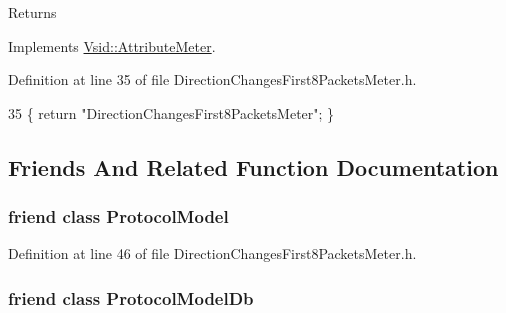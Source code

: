 \begin{DoxyReturn}{Returns}

\end{DoxyReturn}


Implements \hyperlink{class_vsid_1_1_attribute_meter_a24d5a7141e89e948c05edf8f70be8c53}{Vsid\-::\-Attribute\-Meter}.



Definition at line 35 of file Direction\-Changes\-First8\-Packets\-Meter.\-h.


\begin{DoxyCode}
35 \{ \textcolor{keywordflow}{return} \textcolor{stringliteral}{"DirectionChangesFirst8PacketsMeter"}; \}
\end{DoxyCode}


\subsection{Friends And Related Function Documentation}
\hypertarget{class_vsid_1_1_direction_changes_first8_packets_meter_a80219b863d4ff3456933d16bc5f73f45}{
\subsubsection[{Protocol\-Model}]{\setlength{\rightskip}{0pt plus 5cm}friend class {\bf Protocol\-Model}\hspace{0.3cm}{\ttfamily [friend]}}}\label{class_vsid_1_1_direction_changes_first8_packets_meter_a80219b863d4ff3456933d16bc5f73f45}


Definition at line 46 of file Direction\-Changes\-First8\-Packets\-Meter.\-h.

\hypertarget{class_vsid_1_1_direction_changes_first8_packets_meter_a3c0d389e7a9476b06313d8fb9ca9fe68}{
\subsubsection[{Protocol\-Model\-Db}]{\setlength{\rightskip}{0pt plus 5cm}friend class {\bf Protocol\-Model\-Db}\hspace{0.3cm}{\ttfamily [friend]}}}\label{class_vsid_1_1_direction_changes_first8_packets_meter_a3c0d389e7a9476b06313d8fb9ca9fe68}


